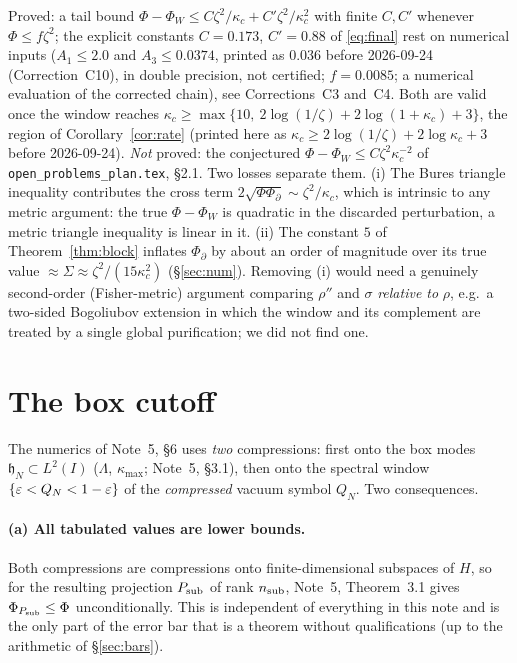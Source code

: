 \documentclass[11pt]{article}
\begin{document}
\begin{verdictgap}
Proved: a tail bound $\Phi-\Phi_W\le C\zeta^2/\kappa_c+C'\zeta^2/\kappa_c^2$ with finite $C,C'$ whenever $\Phi\le f\zeta^2$; the explicit constants
$C=0.173$, $C'=0.88$ of \eqref{eq:final} rest on numerical inputs ($A_1\le2.0$ and $A_3\le0.0374$, printed as $0.036$ before 2026-09-24 (Correction~C10), in double precision, not certified; $f=0.0085$; a numerical evaluation of the corrected chain), see Corrections~C3 and~C4.  Both are valid once the window reaches
$\kappa_c\ge\max\{10,\ 2\log(1/\zeta)+2\log(1+\kappa_c)+3\}$, the region of Corollary~\ref{cor:rate} (printed here as $\kappa_c\ge2\log(1/\zeta)+2\log\kappa_c+3$ before 2026-09-24).  \emph{Not} proved: the conjectured
$\Phi-\Phi_W\le C\zeta^2\kappa_c^{-2}$ of \texttt{open\_problems\_plan.tex}, \S2.1.  Two losses
separate them.  (i) The Bures triangle inequality contributes the cross term
$2\sqrt{\Phi\Phi_\partial}\sim\zeta^2/\kappa_c$, which is intrinsic to any metric argument: the true
$\Phi-\Phi_W$ is quadratic in the discarded perturbation, a metric triangle inequality is linear in
it.  (ii) The constant $5$ of Theorem~\ref{thm:block} inflates $\Phi_\partial$ by about an order of
magnitude over its true value $\approx\Sigma\approx\zeta^2/(15\kappa_c^2)$ (\S\ref{sec:num}).
Removing (i) would need a genuinely second-order (Fisher-metric) argument comparing $\rho''$ and
$\sigma$ \emph{relative to} $\rho$, e.g.\ a two-sided Bogoliubov extension in which the window and its
complement are treated by a single global purification; we did not find one.
\end{verdictgap}
\section{The box cutoff}\label{sec:box}

The numerics of Note~5, \S6 uses \emph{two} compressions: first onto the box modes
$\mathfrak h_N\subset L^2(I)$ ($\Lambda$, $\kappa_{\max}$; Note~5, \S3.1), then onto the spectral
window $\{\varepsilon<Q_N<1-\varepsilon\}$ of the \emph{compressed} vacuum symbol $Q_N$.  Two consequences.

\paragraph{(a) All tabulated values are lower bounds.}  Both compressions are compressions onto
finite-dimensional subspaces of $H$, so for the resulting projection $P_{\rm sub}$ of rank
$n_{\rm sub}$, Note~5, Theorem~3.1 gives $\Phi_{P_{\rm sub}}\le\Phi$ unconditionally.  This is
independent of everything in this note and is the only part of the error bar that is a theorem
without qualifications (up to the arithmetic of \S\ref{sec:bars}).
\end{document}
